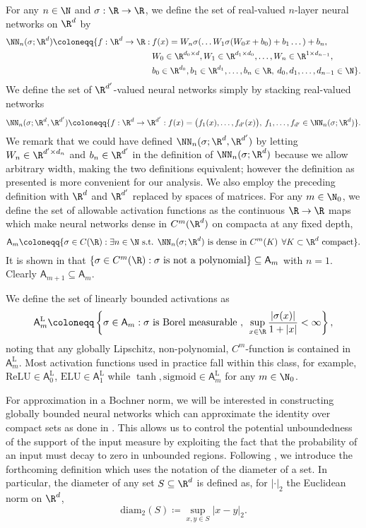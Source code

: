For any \(n \in \N\) and \(\sigma :\R \to \R\), we define the set of real-valued \(n\)-layer neural networks
on \(\R^d\) by
\begin{align*}
\NN_n (\sigma;\R^d) \coloneqq \{ f : \R^d \to \R : \: &f(x) = W_n \sigma ( \dots W_1 \sigma (W_0 x + b_0) + b_1 \dots ) + b_n, \\
&W_0 \in \R^{d_0 \times d}, W_1 \in \R^{d_1 \times d_0}, \dots, W_n \in \R^{1 \times d_{n-1}}, \\
&b_0 \in \R^{d_0}, b_1 \in \R^{d_1}, \dots, b_n \in \R, \: d_0,d_1,\dots,d_{n-1} \in \N\}.
\end{align*}
We define the set of \(\R^{d'}\)-valued neural networks simply by stacking real-valued networks
\[\NN_n(\sigma;\R^d, \R^{d'}) \coloneqq \{f : \R^d \to \R^{d'} : f(x) = \bigl ( f_1(x), \dots, f_{d'}(x) \bigl), \: f_1,\dots,f_{d'} \in \NN_n(\sigma;\R^d)\}.\]
We remark that we could have defined \(\NN_n(\sigma;\R^d, \R^{d'})\) by letting \(W_n \in \R^{d' \times d_n}\) and \(b_n \in \R^{d'}\) in 
the definition of \(\NN_n(\sigma;\R^d)\) because we allow arbitrary width, making the two definitions equivalent; however the definition as presented is  more  convenient  for  our  analysis. We also employ the preceding definition with $\R^d$ and $\R^{d'}$ 
replaced by spaces of matrices.
For any \(m \in \N_0\), we define the set of allowable activation functions as the continuous \(\R \to \R\) maps which make
neural networks dense in \(C^m(\R^d)\) on compacta at any fixed depth,
\[\mathsf{A}_m \coloneqq \{\sigma \in C(\R) : \exists n \in \N \text{ s.t. } \NN_n(\sigma;\R^d) \text{ is dense in } C^m(K) \:\: \forall K \subset \R^d \text{ compact}\}.\]
It is shown in \cite[Theorem 4.1]{pinkus1999approximation} that \(\{\sigma \in C^m(\R) : \sigma \text{ is not a polynomial}\} \subseteq \mathsf{A}_m\) with \(n = 1\).
Clearly \(\mathsf{A}_{m+1} \subseteq \mathsf{A}_{m}\).

We define the set of linearly bounded activations as
\[\mathsf{A}^{\text{L}}_m \coloneqq \left \{ \sigma \in \mathsf{A}_m : \sigma \text{ is Borel measurable }, \:\: \sup_{x \in \R} \frac{|\sigma(x)|}{1 + |x|} < \infty \right \},\]
noting that any globally Lipschitz, non-polynomial, \(C^m\)-function is contained in \(\mathsf{A}^{\text{L}}_m\). Most activation functions 
used in practice fall within this class, for example, \(\text{ReLU} \in \mathsf{A}^{\text{L}}_0\), \(\text{ELU} \in \mathsf{A}^{\text{L}}_1\)
while \(\tanh, \text{sigmoid} \in \mathsf{A}^{\text{L}}_m\) for any \(m \in \N_0\). 

For approximation in a Bochner norm, we will be interested in constructing 
globally bounded neural networks which can approximate the identity over compact sets as done in \citep{lanthaler2021error, Kovachki}. This allows us to control the potential unboundedness of the support of the input measure by exploiting the fact that the probability of an input must decay to zero in unbounded regions. Following \citep{lanthaler2021error}, we introduce the forthcoming definition which uses the notation of the diameter of a set. In particular, the diameter of any set \(S \subseteq \R^d\) is defined as, for
$|\cdot|_2$ the Euclidean norm on $\R^d$,
\[\text{diam}_2(S) \coloneqq \sup_{x,y \in S} |x - y|_2.\]


